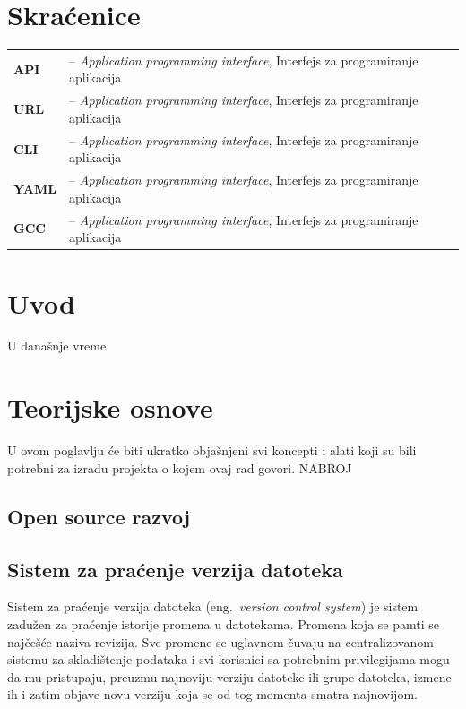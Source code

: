 \documentclass[12pt]{report}
\renewcommand{\chaptermark}[1]{\markboth{#1}{}}
\newcommand\frontmatter{
    \cleardoublepage{}
    \pagenumbering{Roman}
    \setlength{\parskip}{0pt}
}
\newcommand\mainmatter{
    \cleardoublepage{}
    \pagenumbering{arabic}
    \setlength{\parskip}{2mm}
    \titleformat{\chapter}{\normalfont\Large\bf\sffamily\raggedleft}{\thechapter.}{12pt}{}
}
\begin{document}
\frontmatter{}

\renewcommand{\MakeUppercase}[1]{#1}
\tableofcontents

\listoffigures

\chapter*{Skraćenice}
\chaptermark{Skraćenice}
\begin{tabular}{ l l }
    \textbf{API} & -- \textit{Application programming interface}, Interfejs za programiranje aplikacija \\
    \textbf{URL} & -- \textit{Application programming interface}, Interfejs za programiranje aplikacija \\
    \textbf{CLI} & -- \textit{Application programming interface}, Interfejs za programiranje aplikacija \\
    \textbf{YAML} & -- \textit{Application programming interface}, Interfejs za programiranje aplikacija \\
    \textbf{GCC} & -- \textit{Application programming interface}, Interfejs za programiranje aplikacija \\
\end{tabular}

\mainmatter{}
\chapter{Uvod}
U današnje vreme

\chapter{Teorijske osnove}
U ovom poglavlju će biti ukratko objašnjeni svi koncepti i alati koji su bili potrebni za izradu projekta o kojem ovaj rad govori. NABROJ
\section{Open source razvoj}
\section{Sistem za praćenje verzija datoteka}
Sistem za praćenje verzija datoteka (eng.\ \textit{version control system}) je sistem zadužen za praćenje istorije promena u datotekama. Promena koja se pamti se najčešće naziva revizija. Sve promene se uglavnom čuvaju na centralizovanom sistemu za skladištenje podataka i svi korisnici sa potrebnim privilegijama mogu da mu pristupaju, preuzmu najnoviju verziju datoteke ili grupe datoteka, izmene ih i zatim objave novu verziju koja se od tog momenta smatra najnovijom.
\end{document}
